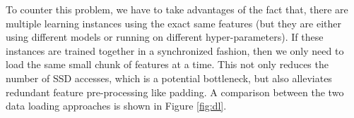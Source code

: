 \documentclass[conference]{IEEEtran}
\begin{document}
To counter this problem, we have to take advantages of the fact that, there are multiple learning instances using the exact same features (but they are either using different models or running on different hyper-parameters). 
If these instances are trained together in a synchronized fashion, then we only need to load the same small chunk of features at a time. 
This not only reduces the number of SSD accesses, which is a potential bottleneck, but also alleviates redundant feature pre-processing like padding. 
A comparison between the two data loading approaches is shown in Figure \ref{fig:dl}.

\begin{figure}[!htb] 
	
	

\end{figure}
\end{document}
